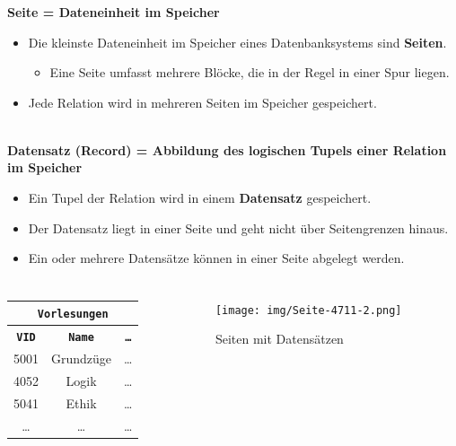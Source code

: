 \begin{frame}
\frametitle{\insertsection}
\framesubtitle{\insertsubsection}
\textbf{Seite = Dateneinheit im Speicher}
\begin{itemize}
	\item Die kleinste Dateneinheit im Speicher eines Datenbanksystems sind \textbf{Seiten}.
	\begin{itemize}
		\item Eine Seite umfasst mehrere Bl\"ocke, die in der Regel in einer Spur liegen.
	\end{itemize}
	\item Jede Relation wird in mehreren Seiten im Speicher gespeichert.
\end{itemize}
\pause
\ \\[20pt]
\textbf{Datensatz (Record) = Abbildung des logischen Tupels einer Relation im Speicher}
\begin{itemize}
	\item Ein Tupel der Relation wird in einem \textbf{Datensatz} gespeichert.
	\item Der Datensatz liegt in einer Seite und geht nicht \"uber Seitengrenzen hinaus.
	\item Ein oder mehrere Datens\"atze können in einer Seite abgelegt werden.
\end{itemize}
\end{frame}

\begin{frame}
\frametitle{\insertsection}
\framesubtitle{\insertsubsection}
\begin{columns}	
\begin{column}{.3\textwidth}
	\begin{tabular}{|c|c|c|}\hline
		\multicolumn{3}{|c|}{\small \textbf{\texttt{Vorlesungen}}}\\\hline\hline
		\small \textbf{{\texttt{VID}}} & \small \textbf{{\texttt{Name}}} & \small \textbf{{\texttt{\ldots}}}\\\hline 
		\small 5001 & \small Grundz\"uge & \small \ldots\\\hline 
		\small 4052 & \small Logik & \small \ldots\\\hline 
		\small 5041 & \small Ethik  & \small \ldots\\\hline 
		\small \ldots & \small \ldots & \small \ldots\\\hline 
	\end{tabular}
	\hspace{3mm}
\end{column}
\begin{column}{.48\textwidth}
	\begin{figure}
		\texttt{[image: img/Seite-4711-2.png]}
		\caption{Seiten mit Datens\"atzen}
	\end{figure}
\end{column}\end{columns}
\end{frame}

